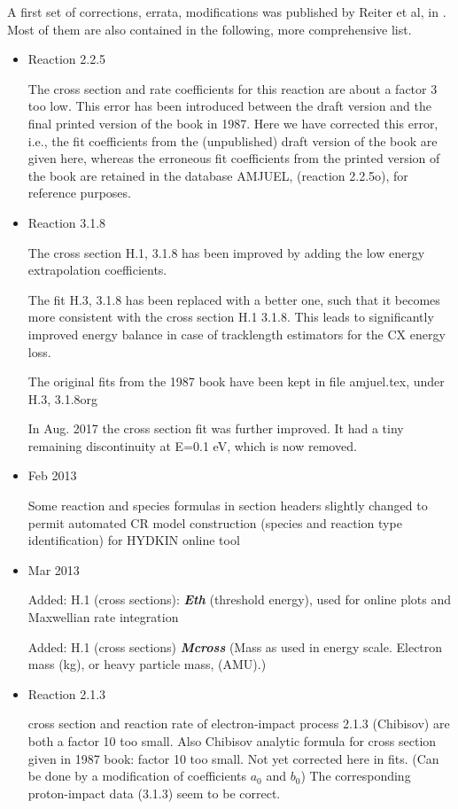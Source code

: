 \documentclass[12pt,dvipdfmx]{article}
\begin{document}
A first set of corrections, errata, modifications was published by Reiter et al,
in \cite{kn:Reiter92}.
Most of them are also contained in the following, more comprehensive list.
\begin{itemize}
\item{Reaction 2.2.5}

The cross section and rate coefficients for this reaction are about a
factor 3 too low. This error has been introduced between the draft version and
the final printed version of the book in 1987. Here we have corrected this error,
i.e., the fit coefficients from the (unpublished) draft version of the book are
given here, whereas the erroneous fit coefficients from the printed version
of the book are retained in the database AMJUEL, (reaction 2.2.5o), for reference
purposes.
\item{Reaction 3.1.8}

The cross section H.1, 3.1.8 has been improved by adding
the low energy extrapolation coefficients.

The fit H.3, 3.1.8 has been replaced with a better one, such that
it becomes more consistent with the cross section H.1 3.1.8.
This leads to significantly improved energy balance in case of
tracklength estimators for the CX energy loss.

The original fits from the 1987 book have been kept in file amjuel.tex,
under H.3, 3.1.8org

In Aug. 2017 the cross section fit was further improved. It had a tiny remaining discontinuity
at E=0.1 eV, which is now removed.
\item{Feb 2013}

Some reaction and species formulas in section headers slightly changed to permit automated CR
model construction (species and reaction type identification) for HYDKIN online tool
\item{Mar 2013}

Added: H.1 (cross sections): \textbf{\emph{Eth}} (threshold energy), used for online plots and Maxwellian rate integration

Added: H.1 (cross sections) \textbf{\emph{Mcross}} (Mass as used in energy scale. Electron mass (kg), or heavy particle mass, (AMU).)

\item{Reaction 2.1.3}

cross section and reaction rate of electron-impact process 2.1.3 (Chibisov) are both
a factor 10 too small.
Also Chibisov analytic formula for cross section given in 1987 book:
factor 10 too small.
Not yet corrected here in fits.
(Can be done by a modification of coefficients $a_0$ and $b_0$)
The corresponding proton-impact data (3.1.3) seem to be correct.


\end{itemize}
\end{document}
